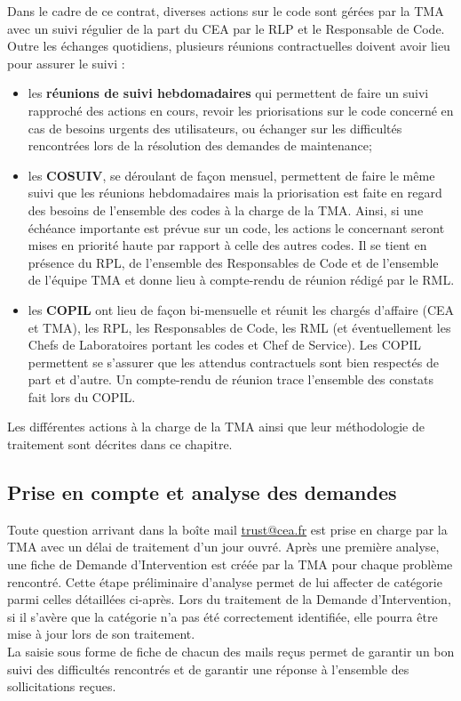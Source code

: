 Dans le cadre de ce contrat, diverses actions sur le code sont gérées par la TMA avec
un suivi régulier de la part du CEA par le RLP et le Responsable de Code.
Outre les échanges quotidiens, plusieurs réunions contractuelles doivent avoir lieu pour assurer le suivi :\\ 
\begin{itemize}[label=$\Rightarrow$, font=\LARGE]
   \item les \textbf{réunions de suivi hebdomadaires} qui permettent de faire
         un suivi rapproché des actions en cours,
         revoir les priorisations sur le code concerné en cas de besoins urgents des utilisateurs,
         ou échanger sur les difficultés rencontrées lors de la résolution des demandes de maintenance;
   \item les \textbf{COSUIV}, se déroulant de façon mensuel, permettent de faire le même suivi
         que les réunions hebdomadaires mais la priorisation est faite en regard des besoins de l'ensemble
         des codes à la charge de la TMA.
         Ainsi, si une échéance importante est prévue sur un code,
         les actions le concernant seront mises en priorité haute par rapport à celle des autres codes.
         Il se tient en présence du RPL, de l'ensemble des Responsables de Code
         et de l'ensemble de l'équipe TMA et donne lieu à compte-rendu de réunion rédigé par le RML.
   \item les \textbf{COPIL} ont lieu de fa\c con bi-mensuelle et réunit les chargés d'affaire (CEA et TMA),
   les RPL, les Responsables de Code, les RML
   (et éventuellement les Chefs de Laboratoires portant les codes et Chef de Service).
   Les COPIL permettent se s'assurer que les attendus contractuels sont bien
   respectés de part et d'autre.
   Un compte-rendu de réunion trace l'ensemble des constats fait lors du COPIL.
\end{itemize}

Les différentes actions à la charge de la TMA ainsi que leur méthodologie de traitement sont décrites dans ce chapitre.

\subsection{Prise en compte et analyse des demandes}
Toute question arrivant dans la boîte mail \href{mailto:trust@cea.fr}{trust@cea.fr}
est prise en charge par la TMA avec un délai de traitement d'un jour ouvré.
Après une première analyse, une fiche de Demande d'Intervention est créée par
la TMA pour chaque problème rencontré. Cette étape préliminaire d'analyse permet
de lui affecter de catégorie parmi celles détaillées ci-après.
Lors du traitement de la Demande d'Intervention, si il s'avère que la catégorie
n'a pas été correctement identifiée, elle pourra être mise à jour lors de son traitement.\\
La saisie sous forme de fiche de chacun des mails reçus permet de garantir
un bon suivi des difficultés rencontrés et de garantir
une réponse à l'ensemble des sollicitations   re\c cues.

